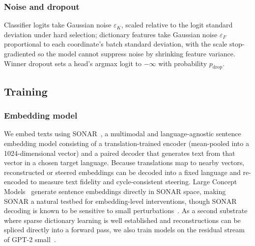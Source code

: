 \subsubsection{Noise and dropout}
\label{sec:noise}
Classifier logits take Gaussian noise $\varepsilon_K$, scaled relative to
the logit standard deviation under hard selection; dictionary features
take Gaussian noise $\varepsilon_F$ proportional to each coordinate's
batch standard deviation, with the scale stop-gradiented so the model
cannot suppress noise by shrinking feature variance. Winner dropout sets
a head's argmax logit to $-\infty$ with probability $p_{\mathrm{drop}}$.

\subsection{Training}
\label{sec:training}

\subsubsection{Embedding model}
\label{sec:sonar}
We embed texts using SONAR~\cite{sonar}, a multimodal and
language-agnostic sentence embedding model consisting of a
translation-trained encoder (mean-pooled into a 1024-dimensional vector)
and a paired decoder that generates text from that vector in a chosen
target language. Because translations map to nearby vectors, reconstructed
or steered embeddings can be decoded into a fixed language and re-encoded
to measure text fidelity and cycle-consistent steering. Large Concept
Models~\cite{lcmteam2024largeconceptmodelslanguage} generate sentence
embeddings directly in SONAR space, making SONAR a natural testbed for
embedding-level interventions, though SONAR decoding is known to be
sensitive to small perturbations~\cite{lcmteam2024largeconceptmodelslanguage}.
As a second substrate where sparse dictionary learning is well
established and reconstructions can be spliced directly into a forward
pass, we also train models on the residual stream of GPT-2
small~\cite{radford2019}.

